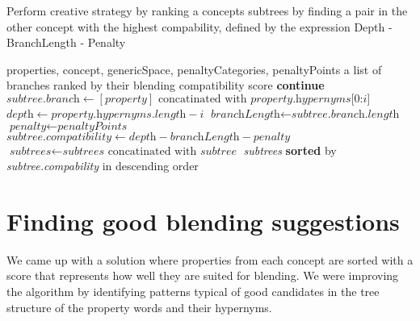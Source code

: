 \begin{algorithm}
	\caption{Perform creative strategy by ranking a concepts subtrees by finding a pair in the other concept with the highest compability, defined by the expression Depth - BranchLength - Penalty}\label{euclid}
	\begin{algorithmic}[1]
		\Require properties,
		concept,
		genericSpace,
		penaltyCategories,
		penaltyPoints
		\Ensure a list of branches ranked by their blending compatibility score
		\State \textbf{continue}
		\EndIf
		\EndIf
		\State ${\textit{subtree.branch} \gets {[\textit{property}] \text{ concatinated with } \textit{property.hypernyms[0:i]}}}$
		\State ${\textit{depth} \gets {\textit{property.hypernyms.length} - i}}$
		\State ${\textit{branchLength} \gets {\textit{subtree.branch.length}}}$
		\State ${\textit{penalty} \gets \textit{penaltyPoints}}$
		\EndIf
		\State ${\textit{subtree.compatibility} \gets {\textit{depth} - \textit{branchLength} - \textit{penalty}}}$
		\State ${\textit{subtrees} \gets {\textit{subtrees} \text{ concatinated with } \textit{subtree}}}$
		\EndFor
		\EndFor
		\State \Return \textit{subtrees} \textbf{sorted} by \textit{subtree.compability} in descending order
		\EndProcedure
	\end{algorithmic}
\end{algorithm}


\section{Finding good blending suggestions}
We came up with a solution where properties from each concept are sorted with a score that represents how well they are suited for blending. We were improving the algorithm by identifying patterns typical of good candidates in the tree structure of the property words and their hypernyms.
